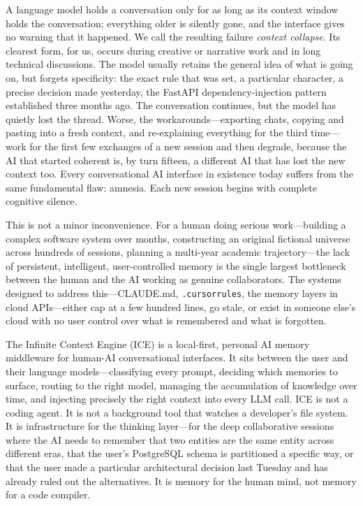 \documentclass[10pt]{article}
\begin{document}
A language model holds a conversation only for as long as its context window holds the conversation; everything older is silently gone, and the interface gives no warning that it happened. We call the resulting failure \emph{context collapse}. Its clearest form, for us, occurs during creative or narrative work and in long technical discussions. The model usually retains the general idea of what is going on, but forgets specificity: the exact rule that was set, a particular character, a precise decision made yesterday, the FastAPI dependency-injection pattern established three months ago. The conversation continues, but the model has quietly lost the thread. Worse, the workarounds---exporting chats, copying and pasting into a fresh context, and re-explaining everything for the third time---work for the first few exchanges of a new session and then degrade, because the AI that started coherent is, by turn fifteen, a different AI that has lost the new context too. Every conversational AI interface in existence today suffers from the same fundamental flaw: amnesia. Each new session begins with complete cognitive silence.

This is not a minor inconvenience. For a human doing serious work---building a complex software system over months, constructing an original fictional universe across hundreds of sessions, planning a multi-year academic trajectory---the lack of persistent, intelligent, user-controlled memory is the single largest bottleneck between the human and the AI working as genuine collaborators. The systems designed to address this---CLAUDE.md, \texttt{.cursorrules}, the memory layers in cloud APIs---either cap at a few hundred lines, go stale, or exist in someone else's cloud with no user control over what is remembered and what is forgotten.

The Infinite Context Engine (ICE) is a local-first, personal AI memory middleware for human-AI conversational interfaces. It sits between the user and their language models---classifying every prompt, deciding which memories to surface, routing to the right model, managing the accumulation of knowledge over time, and injecting precisely the right context into every LLM call. ICE is not a coding agent. It is not a background tool that watches a developer's file system. It is infrastructure for the thinking layer---for the deep collaborative sessions where the AI needs to remember that two entities are the same entity across different eras, that the user's PostgreSQL schema is partitioned a specific way, or that the user made a particular architectural decision last Tuesday and has already ruled out the alternatives. It is memory for the human mind, not memory for a code compiler.
\end{document}

